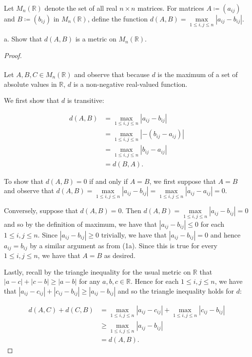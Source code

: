 Let $M_n(\mathbb{R})$ denote the set of all real $n \times n$ matrices. For matrices
$A \coloneqq (a_{ij})$ and $B \coloneqq (b_{ij})$ in $M_n{(\mathbb{R})}$, define
the function $d(A, B) = \max\limits_{1 \le i,j \le n}{|a_{ij} - b_{ij}|}$.

a.  Show that $d(A, B)$ is a metric on $M_n(\mathbb{R})$. \ \\

    \begin{proof}\ \\\\
        Let $A, B, C \in M_n(\mathbb{R})$ and observe that because $d$ is the maximum of a set of absolute values in
        $\mathbb{R}$, $d$ is a non-negative real-valued function.
        
        We first show that $d$ is transitive:

        \begin{align*}
            d(A, B) &= \max\limits_{1 \le i,j \le n}{|a_{ij} - b_{ij}|} \\
                    &= \max\limits_{1 \le i,j \le n}{|-(b_{ij} - a_{ij})|} \\
                    &= \max\limits_{1 \le i,j \le n}{|b_{ij} - a_{ij}|} \\
                    &= d(B, A). 
        \end{align*}

        To show that $d(A, B) = 0$ if and only if $A = B$, we first suppose that $A = B$ and observe that
        $d(A, B) = \max\limits_{1 \le i,j \le n}{|a_{ij} - b_{ij}|} = \max\limits_{1 \le i,j \le n}{|a_{ij} - a_{ij}|} = 0$.
        
        Conversely, suppose that $d(A, B) = 0$. Then $d(A, B) = \max\limits_{1 \le i,j \le n}{|a_{ij} - b_{ij}|} = 0$
        and so by the definition of maximum, we have that $|a_{ij} - b_{ij}| \le 0$ for each $1 \le i, j \le n$. Since
        $|a_{ij} - b_{ij}| \ge 0$ trivially, we have that $|a_{ij} - b_{ij}| = 0$ and hence $a_{ij} = b_{ij}$ by a
        similar argument as from (1a). Since this is true for every $1 \le i, j \le n$, we have that $A = B$ as
        desired.
        
        Lastly, recall by the triangle inequality for the usual metric on $\mathbb{R}$ that \linebreak 
        $|a - c| + |c - b| \ge |a - b|$ for any $a, b, c \in \mathbb{R}$. Hence for each $1 \le i, j \le n$, we have
        that $|a_{ij} - c_{ij}| + |c_{ij} - b_{ij}| \ge |a_{ij} - b_{ij}|$ and so the triangle inequality holds for $d$:

        \begin{align*}
            d(A, C) + d(C, B) &= \max\limits_{1 \le i,j \le n}{|a_{ij} - c_{ij}|} + \max\limits_{1 \le i,j \le n}{|c_{ij} - b_{ij}|} \\
                              &\ge \max\limits_{1 \le i,j \le n}{|a_{ij} - b_{ij}|} \\
                              &= d(A, B).
        \end{align*}
    \end{proof}

